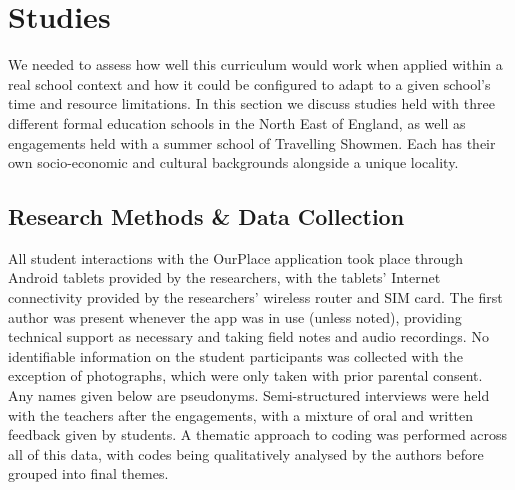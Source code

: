 \section{Studies}

We needed to assess how well this curriculum would work when applied within a real school context and how it could be configured to adapt to a given school's time and resource limitations. In this section we discuss studies held with three different formal education schools in the North East of England, as well as engagements held with a summer school of Travelling Showmen. Each has their own socio-economic and cultural backgrounds alongside a unique locality.

\subsection{Research Methods \& Data Collection}

All student interactions with the OurPlace application took place through Android tablets provided by the researchers, with the tablets' Internet connectivity provided by the researchers' wireless router and SIM card. The first author was present whenever the app was in use (unless noted), providing technical support as necessary and taking field notes and audio recordings. No identifiable information on the student participants was collected with the exception of photographs, which were only taken with prior parental consent. Any names given below are pseudonyms. Semi-structured interviews were held with the teachers after the engagements, with a mixture of oral and written feedback given by students. A thematic approach to coding was performed across all of this data, with codes being qualitatively analysed by the authors before grouped into final themes.

